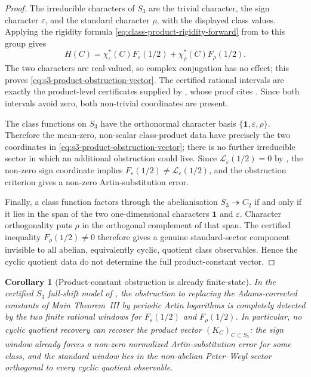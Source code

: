\documentclass[11pt,a4paper]{amsart}
\theoremstyle{plain}
\newtheorem{corollary}[theorem]{Corollary}
\theoremstyle{definition}
\theoremstyle{remark}
\begin{document}
\begin{proof}
  The irreducible characters of \(S_3\) are the trivial character, the sign
  character \(\varepsilon\), and the standard character \(\rho\), with the
  displayed class values.  Applying the rigidity formula
  \eqref{eq:class-product-rigidity-forward} from
   to this group gives
  \[
    H(C)=\chi_\varepsilon^\ast(C)F_\varepsilon(1/2)
      +\chi_\rho^\ast(C)F_\rho(1/2).
  \]
  The two characters are real-valued, so complex conjugation has no effect;
  this proves \eqref{eq:s3-product-obstruction-vector}.  The certified
  rational intervals are exactly the product-level certificates supplied by
  , whose proof cites
  .  Since both intervals avoid
  zero, both non-trivial coordinates are present.

  The class functions on \(S_3\) have the orthonormal character basis
  \(\{\mathbf1,\varepsilon,\rho\}\).  Therefore the mean-zero, non-scalar
  class-product data have precisely the two coordinates in
  \eqref{eq:s3-product-obstruction-vector}; there is no further irreducible
  sector in which an additional obstruction could live.  Since
  \(\mathcal L_\varepsilon(1/2)=0\) by
  , the non-zero sign coordinate
  implies
  \(F_\varepsilon(1/2)\neq\mathcal L_\varepsilon(1/2)\), and the obstruction
  criterion  gives a non-zero
  Artin-substitution error.

  Finally, a class function factors through the abelianisation
  \(S_3\twoheadrightarrow C_2\) if and only if it lies in the span of the
  two one-dimensional characters \(\mathbf1\) and \(\varepsilon\).  Character
  orthogonality puts \(\rho\) in the orthogonal complement of that span.
  The certified inequality \(F_\rho(1/2)\neq0\) therefore gives a genuine
  standard-sector component invisible to all abelian, equivalently cyclic,
  quotient class observables.  Hence the cyclic quotient data do not
  determine the full product-constant vector.
\end{proof}

\begin{corollary}[Product-constant obstruction is already finite-state]
  \label{cor:s3-product-constant-obstruction-finite-state}
  In the certified \(S_3\) full-shift model of
  , the obstruction to replacing
  the Adams-corrected constants of Main Theorem~III by periodic Artin
  logarithms is completely detected by the two finite rational windows for
  \(F_\varepsilon(1/2)\) and \(F_\rho(1/2)\).  In particular, no cyclic
  quotient recovery can recover the product vector
  \((K_C)_{C\subset S_3}\): the sign window already forces a non-zero
  normalized Artin-substitution error for some class, and the standard
  window lies in the non-abelian Peter--Weyl sector orthogonal to every
  cyclic quotient observable.
\end{corollary}
\end{document}
